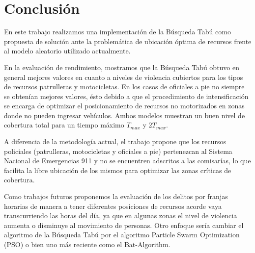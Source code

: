 \section{Conclusión}
En este trabajo realizamos una implementación de la Búsqueda Tabú como propuesta de solución ante la problemática de ubicación óptima de recursos frente al modelo aleatorio utilizado actualmente.

En la evaluación de rendimiento, mostramos que la Búsqueda Tabú obtuvo en general mejores valores en cuanto a niveles de violencia cubiertos para los tipos de recursos patrulleras y motocicletas. En los casos de oficiales a pie no siempre se obtenían mejores valores, ésto debido a que el procedimiento de intensificación se encarga de optimizar el posicionamiento de recursos no motorizados en zonas donde no pueden ingresar vehículos.
Ambos modelos muestran un buen nivel de cobertura total para un tiempo máximo $T_{max}$ y $2T_{max}$.

A diferencia de la metodología actual, el trabajo propone que los recursos policiales (patrulleras, motocicletas y oficiales a pie) pertenezcan al Sistema Nacional de Emergencias 911 y no se encuentren adscritos a las comisarías, lo que facilita la libre ubicación de los mismos para optimizar las zonas críticas de cobertura.

Como trabajos futuros proponemos la evaluación de los delitos por franjas horarias de manera a tener diferentes posiciones de recursos acorde vaya transcurriendo las horas del día, ya que en algunas zonas el nivel de violencia aumenta o disminuye al movimiento de personas. Otro enfoque sería cambiar el algoritmo de la Búsqueda Tabú por el algoritmo Particle Swarm Optimization (PSO) o bien uno más reciente como el Bat-Algorithm.